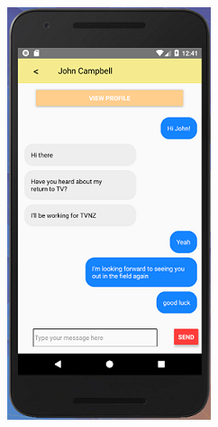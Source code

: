 \documentclass[a4paper, 11pt]{article}
\begin{document}
\begin{figure}
\centering
\begin{minipage}{.55\textwidth}
  \centering
  \includegraphics[width=.7\linewidth]{messenger.png}
  \label{fig:test1}
\end{minipage}%
\begin{minipage}{.55\textwidth}
  \centering
\captionsetup{format=hang}

\end{minipage}
\end{figure}
\end{document}
